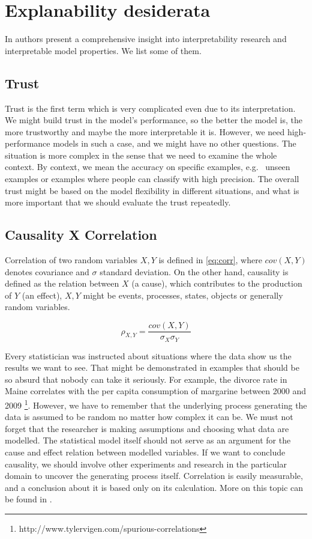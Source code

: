 \section{Explanability desiderata}
In \cite{Lipton2016} authors present a comprehensive insight into interpretability research and interpretable model properties. We list some of them.

\subsection{Trust}
Trust is the first term which is very complicated even due to its interpretation. We might build trust in the model's performance, so the better the model is, the more trustworthy and maybe the more interpretable it is. However, we need high-performance models in such a case, and we might have no other questions. The situation is more complex in the sense that we need to examine the whole context. By context, we mean the accuracy on specific examples, e.g. \ unseen examples or examples where people can classify with high precision. The overall trust might be based on the model flexibility in different situations, and what is more important that we should evaluate the trust repeatedly.

\subsection{Causality X Correlation}
Correlation of two random variables $X,Y$ is defined in \ref{eq:corr}, where $cov(X,Y)$ denotes covariance and $\sigma$ standard deviation. On the other hand, causality is defined as the relation between $X$ (a cause), which contributes to the production of $Y$ (an effect), $X, Y$ might be events, processes, states, objects or generally random variables.

\begin{equation} \label{eq:corr}
    \rho_{X,Y}=\frac{cov(X,Y)}{\sigma_X\sigma_Y}
\end{equation}

Every statistician was instructed about situations where the data show us the results we want to see. That might be demonstrated in examples that should be so absurd that nobody can take it seriously. For example, the divorce rate in Maine correlates with the per capita consumption of margarine between 2000 and 2009 \footnote{http://www.tylervigen.com/spurious-correlations}. However, we have to remember that the underlying process generating the data is assumed to be random no matter how complex it can be. We must not forget that the researcher is making assumptions and choosing what data are modelled. The statistical model itself should not serve as an argument for the cause and effect relation between modelled variables. If we want to conclude causality, we should involve other experiments and research in the particular domain to uncover the generating process itself. Correlation is easily measurable, and a conclusion about it is based only on its calculation. More on this topic can be found in \cite{Kenny1979}.

